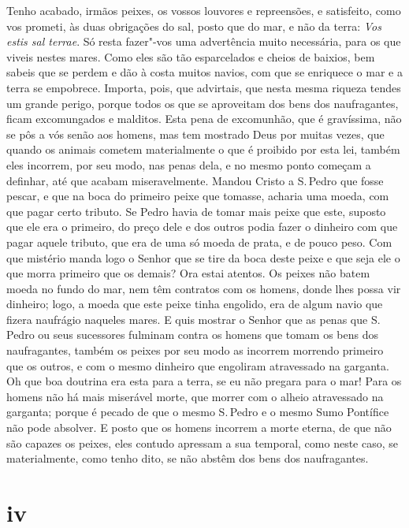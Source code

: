 Tenho acabado, irmãos peixes, os vossos louvores e repreensões, e
satisfeito, como vos prometi, às duas obrigações do sal, posto que do
mar, e não da terra: \emph{Vos estis sal terrae}. Só resta fazer"-vos uma
advertência muito necessária, para os que viveis nestes mares. Como eles
são tão esparcelados e cheios de baixios, bem sabeis que se perdem e dão
à costa muitos navios, com que se enriquece o mar e a terra se
empobrece. Importa, pois, que advirtais, que nesta mesma riqueza tendes
um grande perigo, porque todos os que se aproveitam dos bens dos
naufragantes, ficam excomungados e malditos.
Esta pena de excomunhão, que é gravíssima, não se pôs a vós senão aos
homens, mas tem mostrado Deus por muitas vezes, que quando os animais
cometem materialmente o que é proibido por esta lei, também eles
incorrem, por seu modo, nas penas dela, e no mesmo ponto começam a
definhar, até que acabam miseravelmente.
Mandou Cristo a S.\,Pedro que fosse pescar, e que na boca do primeiro
peixe que tomasse, acharia uma moeda, com que pagar certo tributo. Se
Pedro havia de tomar mais peixe que este, suposto que ele era o
primeiro, do preço dele e dos outros podia fazer o dinheiro com que
pagar aquele tributo, que era de uma só moeda de prata, e de pouco peso.
Com que mistério manda logo o Senhor que se tire da boca deste peixe e
que seja ele o que morra primeiro que os demais?
Ora estai atentos. Os peixes não batem moeda no fundo do mar, nem têm
contratos com os homens, donde lhes possa vir dinheiro; logo, a moeda
que este peixe tinha engolido, era de algum navio que fizera naufrágio
naqueles mares. E quis mostrar o Senhor que as penas que S.\,Pedro ou
seus sucessores fulminam contra os homens que tomam os bens dos
naufragantes, também os peixes por seu
modo as incorrem morrendo primeiro que os outros, e com o mesmo dinheiro
que engoliram atravessado na garganta.
Oh que boa doutrina era esta para a terra, se eu não pregara para o mar!
Para os homens não há mais miserável morte, que morrer com o alheio
atravessado na garganta; porque é pecado de que o mesmo S.\,Pedro e o
mesmo Sumo Pontífice não pode absolver. E posto que os homens incorrem a
morte eterna, de que não são capazes os peixes, eles contudo apressam a
sua temporal, como neste caso, se materialmente, como tenho dito, se não
abstêm dos bens dos naufragantes.

\section{iv}

